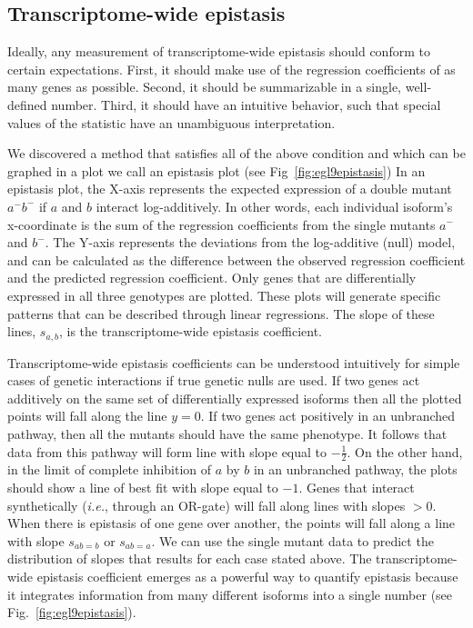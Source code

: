 \documentclass[9pt,twocolumn,twoside,lineno]{pnas-new}
\begin{document}
\subsection*{Transcriptome-wide epistasis}
Ideally, any measurement of transcriptome-wide epistasis should conform to
certain expectations. First, it should make use of the regression coefficients
of as many genes as possible. Second, it should be summarizable in a single,
well-defined number. Third, it should have an intuitive behavior, such that
special values of the statistic have an unambiguous interpretation.

We discovered a method that satisfies all of the above condition and which can
be graphed in a plot we call an epistasis plot (see Fig~\ref{fig:egl9epistasis})
In an epistasis plot, the X-axis represents the expected expression of a double
mutant $a^-b^-$ if $a$ and $b$ interact log-additively. In other words, each
individual isoform's x-coordinate is the sum of the regression coefficients from
the single mutants $a^-$ and $b^-$. The Y-axis represents the deviations from
the log-additive (null) model, and can be calculated as the difference between
the observed regression coefficient and the predicted regression coefficient.
Only genes that are differentially expressed in all three genotypes are plotted.
These plots will generate specific patterns that can be described through linear
regressions. The slope of these lines, $s_{a,b}$, is the transcriptome-wide
epistasis coefficient.

Transcriptome-wide epistasis coefficients can be understood intuitively for
simple cases of genetic interactions if true genetic nulls are used. If two
genes act additively on the same set of differentially expressed isoforms then
all the plotted points will fall along the line $y=0$. If two genes act
positively in an unbranched pathway, then all the mutants should have the same
phenotype. It follows that data from this pathway will form line with slope
equal to $-\frac{1}{2}$. On the other hand, in the limit of complete inhibition
of $a$ by $b$ in an unbranched pathway, the plots should show a line of best fit
with slope equal to $-1$.
Genes that interact synthetically (\emph{i.e.}, through an OR-gate)
will fall along lines with slopes $>0$. When there is epistasis of one gene over
another, the points will fall along a line with slope $s_{ab=b}$ or $s_{ab=a}$.
We can use the single mutant data to predict the distribution of slopes that
results for each case stated above. The transcriptome-wide epistasis coefficient
emerges as a powerful way to quantify epistasis because it integrates
information from many different isoforms into a single number (see
Fig.~\ref{fig:egl9epistasis}).
\end{document}
